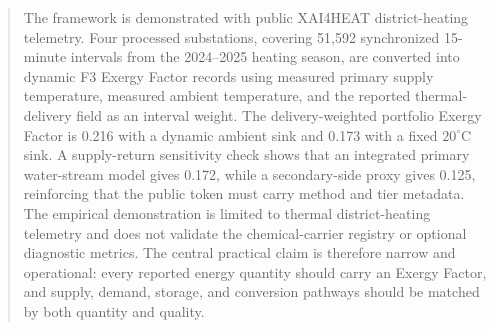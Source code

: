 \documentclass[11pt]{article}
\newcommand{\degC}{^{\circ}\mathrm{C}}
\begin{document}
\begin{abstract}
The framework is demonstrated with public XAI4HEAT district-heating telemetry. Four processed substations, covering 51{,}592 synchronized 15-minute intervals from the 2024--2025 heating season, are converted into dynamic F3 Exergy Factor records using measured primary supply temperature, measured ambient temperature, and the reported thermal-delivery field as an interval weight. The delivery-weighted portfolio Exergy Factor is 0.216 with a dynamic ambient sink and 0.173 with a fixed $20\degC$ sink. A supply-return sensitivity check shows that an integrated primary water-stream model gives 0.172, while a secondary-side proxy gives 0.125, reinforcing that the public token must carry method and tier metadata. The empirical demonstration is limited to thermal district-heating telemetry and does not validate the chemical-carrier registry or optional diagnostic metrics. The central practical claim is therefore narrow and operational: every reported energy quantity should carry an Exergy Factor, and supply, demand, storage, and conversion pathways should be matched by both quantity and quality.
\end{abstract}
\end{document}
